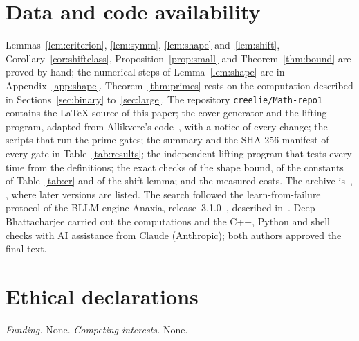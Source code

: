 \section*{Data and code availability}

Lemmas~\ref{lem:criterion}, \ref{lem:symm}, \ref{lem:shape}
and~\ref{lem:shift}, Corollary~\ref{cor:shiftclass},
Proposition~\ref{prop:small} and Theorem~\ref{thm:bound} are proved by
hand; the numerical steps of Lemma~\ref{lem:shape} are in
Appendix~\ref{app:shape}. Theorem~\ref{thm:primes} rests on the computation
described in Sections~\ref{sec:binary} to~\ref{sec:large}. The repository
\texttt{creelie/Math-repo1} contains the \LaTeX{} source of this paper; the
cover generator and the lifting program, adapted from Allikvere's
code~\cite{All26code}, with a notice of every change; the scripts that run
the prime gates; the summary and the SHA-256 manifest of every gate in
Table~\ref{tab:results}; the independent lifting program that tests every
time from the definitions; the exact checks of the shape bound, of the
constants of Table~\ref{tab:cr} and of the shift lemma; and the measured
costs. The archive is~\cite{Archive}, \archivelink, where later versions are
listed. The search followed the learn-from-failure protocol of the BLLM
engine Anaxia, release~3.1.0~\cite{Ana26}, described in~\cite{BB26c}. Deep
Bhattacharjee carried out the computations and the C++, Python and shell
checks with AI assistance from Claude (Anthropic); both authors approved the
final text.

\section*{Ethical declarations}

\emph{Funding.} None. \emph{Competing interests.} None.

